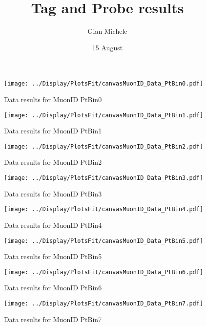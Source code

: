 \documentclass{article}
\begin{document}
\title{Tag and Probe results }
\author{Gian Michele}
\date{15 August}


\maketitle



\begin{figure}
    \texttt{[image: ../Display/PlotsFit/canvasMuonID\_Data\_PtBin0.pdf]}
    \caption{Data results for MuonID PtBin0 }
\end{figure}

\begin{figure}
    \texttt{[image: ../Display/PlotsFit/canvasMuonID\_Data\_PtBin1.pdf]}
    \caption{Data results for MuonID PtBin1 }
\end{figure}

\begin{figure}
    \texttt{[image: ../Display/PlotsFit/canvasMuonID\_Data\_PtBin2.pdf]}
    \caption{Data results for MuonID PtBin2 }
\end{figure}

\begin{figure}
    \texttt{[image: ../Display/PlotsFit/canvasMuonID\_Data\_PtBin3.pdf]}
    \caption{Data results for MuonID PtBin3 }
\end{figure}

\begin{figure}
    \texttt{[image: ../Display/PlotsFit/canvasMuonID\_Data\_PtBin4.pdf]}
    \caption{Data results for MuonID PtBin4 }
\end{figure}

\begin{figure}
    \texttt{[image: ../Display/PlotsFit/canvasMuonID\_Data\_PtBin5.pdf]}
    \caption{Data results for MuonID PtBin5 }
\end{figure}

\begin{figure}
    \texttt{[image: ../Display/PlotsFit/canvasMuonID\_Data\_PtBin6.pdf]}
    \caption{Data results for MuonID PtBin6 }
\end{figure}

\begin{figure}
    \texttt{[image: ../Display/PlotsFit/canvasMuonID\_Data\_PtBin7.pdf]}
    \caption{Data results for MuonID PtBin7 }
\end{figure}
\end{document}
